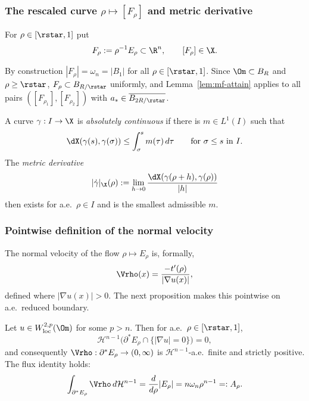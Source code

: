 \subsubsection{The rescaled curve $\rho\mapsto[F_\rho]$ and metric derivative}
\label{sec:metric-F}

\begin{definition}\label{def:mf-F}
For $\rho\in[\rstar,1]$ put
\begin{equation}\label{eq:mf-Frho}
   F_\rho:=\rho^{-1}E_\rho\subset\R^n,\qquad [F_\rho]\in\X.
\end{equation}
\end{definition}

By construction $|F_\rho|=\omega_n=|B_1|$ for all $\rho\in[\rstar,1]$. Since
$\Om\subset B_R$ and $\rho\ge\rstar$, $F_\rho\subset B_{R/\rstar}$ uniformly,
and Lemma~\ref{lem:mf-attain} applies to all pairs
$([F_{\rho_1}],[F_{\rho_2}])$ with $a_*\in\overline{B_{2R/\rstar}}$.

\begin{definition}
\label{def:mf-AGS-AC}
A curve $\gamma:I\to\X$ is \emph{absolutely continuous} if there is
$m\in L^1(I)$ such that
\[
   \dX(\gamma(s),\gamma(\sigma))\le\int_\sigma^s m(\tau)\,d\tau
   \qquad\text{for }\sigma\le s\text{ in }I.
\]
The \emph{metric derivative}
\[
   |\dot\gamma|_\X(\rho):=\lim_{h\to 0}\frac{\dX(\gamma(\rho+h),\gamma(\rho))}{|h|}
\]
then exists for a.e.~$\rho\in I$ and is the smallest admissible $m$.
\end{definition}

\subsubsection{Pointwise definition of the normal velocity}
\label{sec:metric-V}

The normal velocity of the flow $\rho\mapsto E_\rho$ is, formally,
\begin{equation}\label{eq:mf-Vrho}
   \Vrho(x)=\frac{-t'(\rho)}{|\nabla u(x)|},
\end{equation}
defined where $|\nabla u(x)|>0$. The next proposition makes this pointwise
on a.e.~reduced boundary.

\begin{proposition}\label{prop:mf-sard}
Let $u\in W^{2,p}_{\rm loc}(\Om)$ for some $p>n$. Then for a.e.~$\rho\in
[\rstar,1]$,
\begin{equation}\label{eq:mf-sard}
   \mathcal H^{n-1}\bigl(\partial^*E_\rho\cap\{|\nabla u|=0\}\bigr)=0,
\end{equation}
and consequently $\Vrho:\partial^*E_\rho\to(0,\infty)$ is
$\mathcal H^{n-1}$-a.e.\ finite and strictly positive. The flux identity
holds:
\begin{equation}\label{eq:mf-Vflux}
   \int_{\partial^*E_\rho}\Vrho\,d\mathcal H^{n-1}
      =\frac{d}{d\rho}|E_\rho|=n\omega_n\rho^{n-1}=:A_\rho.
\end{equation}
\end{proposition}

